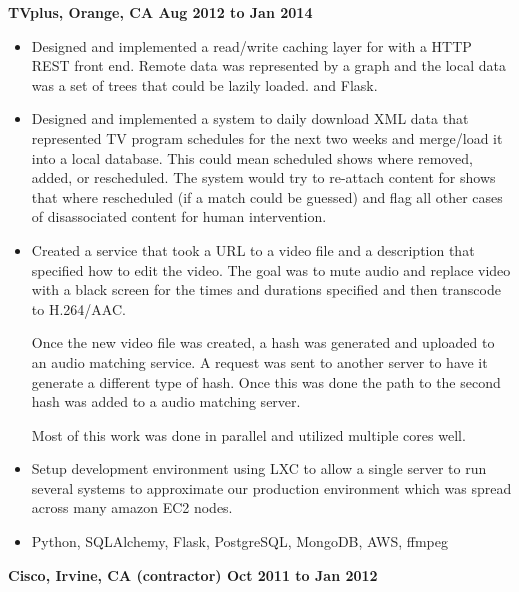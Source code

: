 \documentclass{res}
\begin{document}
\begin{resume}
\begin{itemize}
  \end{itemize}

  {\large \bf TVplus, Orange, CA \hfill Aug 2012 to Jan 2014}

  \begin{itemize}

  \item
    Designed and implemented a read/write caching layer for with a
    HTTP REST front end.
    Remote data was represented by a graph and the
    local data was a set of trees that could be lazily loaded. 
    and Flask.

  \item
    Designed and implemented a system to daily download XML data
    that represented TV program schedules for the next two weeks and
    merge/load it into a local database.  This could mean scheduled
    shows where removed, added, or rescheduled.  The system would try
    to re-attach content for shows that where rescheduled (if a match
    could be guessed) and flag all other cases of disassociated content
    for human intervention.

  \item
    Created a service that took a URL to a video file and a description
    that specified how to edit the video.  The goal was to mute audio
    and replace video with a black screen for the times and durations
    specified and then transcode to H.264/AAC.

    Once the new video file was created, a hash was generated and uploaded
    to an audio matching service. A request was sent to another server
    to have it generate a different type of hash.  Once this was done
    the path to the second hash was added to a audio matching server.

    Most of this work was done in parallel and utilized multiple cores
    well.

  \item
    Setup development environment using LXC to allow a single server to
    run several systems to approximate our production environment which
    was spread across many amazon EC2 nodes.

  \item
    Python, SQLAlchemy, Flask, PostgreSQL, MongoDB, AWS, ffmpeg

  \end{itemize}

  {\large \bf Cisco, Irvine, CA (contractor) \hfill Oct 2011 to Jan 2012}

  \begin{itemize}


\end{itemize}
\end{resume}
\end{document}
